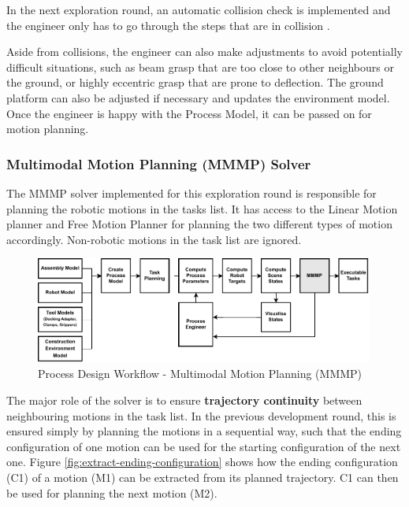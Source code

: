 In the next exploration round, an automatic collision check is implemented and the engineer only has to go through the steps that are in collision .

Aside from collisions, the engineer can also make adjustments to avoid potentially difficult situations, such as beam grasp that are too close to other neighbours or the ground, or highly eccentric grasp that are prone to deflection. The ground platform can also be adjusted if necessary and updates the environment model. Once the engineer is happy with the Process Model, it can be passed on for motion planning. 

\FloatBarrier

\subsubsection{Multimodal Motion Planning (MMMP) Solver}
\label{subsubsection:exploration-3-multimodal-motion-planning-mmmp-solver}

The MMMP solver implemented for this exploration round is responsible for planning the robotic motions in the tasks list. It has access to the Linear Motion planner and Free Motion Planner for planning the two different types of motion accordingly. Non-robotic motions in the task list are ignored.

\begin{figure}[!h]
    \centering
    \includegraphics[width=0.99\textwidth]{images/6a/process_7.pdf}
    \caption{Process Design Workflow - Multimodal Motion Planning (MMMP)}
    \label{fig:process-design-7}
\end{figure}

The major role of the solver is to ensure \textbf{trajectory continuity} between neighbouring motions in the task list. In the previous development round, this is ensured simply by planning the motions in a sequential way, such that the ending configuration of one motion can be used for the starting configuration of the next one. Figure \ref{fig:extract-ending-configuration} shows how the ending configuration (C1) of a motion (M1) can be extracted from its planned trajectory. C1 can then be used for planning the next motion (M2).

